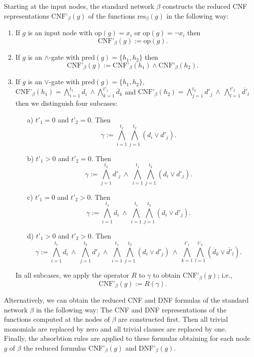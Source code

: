 \documentclass[11pt]{article}
\begin{document}
Starting at the input nodes, the standard network $\beta$ constructs the reduced CNF representations
$\mbox{CNF'}_{\beta}(g)$ of the functions $\mbox{res}_{\beta}(g)$ in the following way:
\begin{enumerate}
\item
  If $g$ is an input node with $\mbox{op}(g) = x_i$ or $\mbox{op}(g) = \neg x_i$ then 
  $$\mbox{CNF'}_{\beta}(g) := \mbox{op}(g).$$
\item
  If $g$ is an $\wedge$-gate with $\mbox{pred}(g) = \{h_1,h_2\}$ then
  $$
  \mbox{CNF'}_{\beta}(g) := \mbox{CNF'}_{\beta}(h_1) \wedge \mbox{CNF'}_{\beta}(h_2).
  $$
\item
  If $g$ is an $\vee$-gate with $\mbox{pred}(g) = \{h_1,h_2\}$,
  $\mbox{CNF'}_{\beta}(h_1) = \bigwedge_{i=1}^{t_1} d_i \: \wedge \bigwedge_{k=1}^{t'_1} \overline{d}_k$ and
  $\mbox{CNF'}_{\beta}(h_2) = \bigwedge_{j=1}^{t_2} d'_j \: \wedge \: \bigwedge_{l=1}^{t'_2} \overline{d'}_l$ then we
  distinguish four subcases:
  \begin{itemize}
  \item[a)] $t'_1 = 0$ and $t'_2 = 0$.
    Then
    $$
    \gamma := \bigwedge_{i=1}^{t_1}\bigwedge_{j=1}^{t_2} (d_i \vee d'_j).
    $$
  \item[b)] $t'_1 > 0$ and $t'_2 = 0$.
    Then
    $$
    \gamma := \bigwedge_{j=1}^{t_2} d'_j \: \wedge \: \bigwedge_{i=1}^{t_1}\bigwedge_{j=1}^{t_2} (d_i \vee d'_j).
    $$
  \item[c)] $t'_1 = 0$ and $t'_2 > 0$.
    Then
    $$
    \gamma := \bigwedge_{i=1}^{t_1} d_i \: \wedge \: \bigwedge_{i=1}^{t_1}\bigwedge_{j=1}^{t_2} (d_i \vee d'_j).
    $$
  \item[d)] $t'_1 > 0$ and $t'_2 > 0$.
    Then
    $$
    \gamma := \bigwedge_{i=1}^{t_1} d_i \: \wedge \: \bigwedge_{j=1}^{t_2} d'_j  \: \wedge \: 
    \bigwedge_{i=1}^{t_1}\bigwedge_{j=1}^{t_2} (d_i \vee d'_j) \: \wedge \:
    \bigwedge_{k=1}^{t'_1}\bigwedge_{l=1}^{t'_2} (\overline{d}_k \vee \overline{d'}_l).
    $$
  \end{itemize}
  In all subcases, we apply the operator $R$ to $\gamma$ to obtain $\mbox{CNF'}_{\beta}(g)$; i.e.,
  $$
  \mbox{CNF'}_{\beta}(g) := R(\gamma).
  $$
\end{enumerate}

Alternatively, we can obtain the reduced CNF and DNF formulas of the standard network $\beta$ in the
following way: 
The CNF and DNF representations of the functions computed at the nodes of $\beta$ are constructed
first. Then all trivial monomials are replaced by zero and all trivial clauses are replaced by one. Finally,
the absorbtion rules are applied
to these formulas obtaining for each node $g$ of $\beta$ the reduced formulas $\mbox{CNF'}_{\beta}(g)$ and
$\mbox{DNF'}_{\beta}(g)$.
\end{document}
